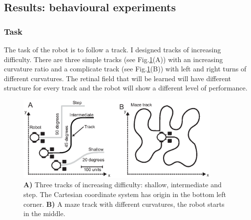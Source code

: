 \subsection{Results: behavioural experiments}

\subsubsection{Task}
The task of the robot is to follow a track.
I designed tracks of increasing difficulty.
There are three simple tracks (see Fig.\ref{PPmeasure:Maps}(A)) with an increasing curvature ratio and a complicate
track (see Fig.\ref{PPmeasure:Maps}(B)) with left and right turns of different curvatures.
The retinal field that will be learned will have different structure for every track and the robot
will show a different level of performance.
\begin{figure}[!hbt]
	\begin{center}
		\includegraphics[width=0.9\textwidth]{figures/ppmeasure/3}
	\end{center}
	\caption[Track shape of increasing curvature]{
	{\bf A)} Three tracks of increasing difficulty: shallow, intermediate and step. 
	The Cartesian coordinate system has origin in the bottom left corner. 
	{\bf B)} A maze track with different curvatures, the robot starts in the middle.
	\label{PPmeasure:Maps}} 

\end{figure}

